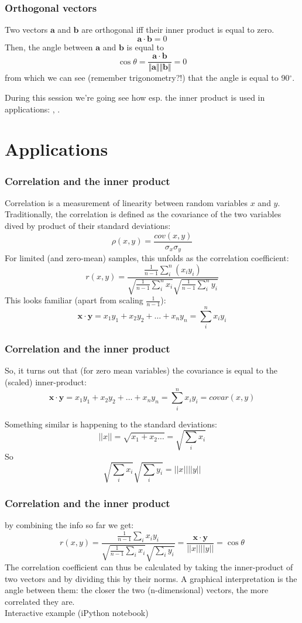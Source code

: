 \documentclass{beamer}
\begin{document}
\begin{frame}
\frametitle{Orthogonal vectors}
Two vectors $\mathbf{a}$ and $\mathbf{b}$ are orthogonal iff their inner product is equal to zero.
$$\mathbf{a} \cdot  \mathbf{b} = 0 $$
Then, the angle between $\mathbf{a}$ and $\mathbf{b}$ is equal to
$$ \cos\theta =\frac{\mathbf{a} \cdot \mathbf{b}}{\Vert \mathbf{a}\Vert  \Vert \mathbf{b} \Vert} = 0$$ from which we can see (remember trigonometry?!) that the angle is equal to 90$^{\circ}$. 

During this session we're going see how esp. the inner product is used in applications: {}  ,  {}.
\end{frame}

\section{Applications}
\begin{frame}
\frametitle{Correlation and the inner product}
Correlation is a measurement of linearity between random variables $x$ and $y$.
Traditionally, the correlation is defined as the covariance of the two variables dived by product of their standard deviations:
$$\rho(x,y) = \frac{cov(x,y)}{\sigma_x\sigma_y}$$
For limited (and zero-mean) samples, this unfolds as the correlation coefficient:
$$r(x,y) = \frac{ \frac{1}{n-1} \sum_i^n (x_i y_i)}
{\sqrt{\frac{1}{n-1}\sum_i^n x_i } \sqrt{\frac{1}{n-1}\sum_i^n y_i}}$$
This looks familiar (apart from scaling $\frac{1}{n-1}$):
$$\mathbf{x} \cdot  \mathbf{y} = x_1 y_1 + x_2 y_2 + \ldots +  x_n y_n = \sum_i^n x_i y_i$$
\end{frame}

\begin{frame}
\frametitle{Correlation and the inner product}
So, it turns out that (for zero mean variables) the covariance is equal to the (scaled) inner-product:
$$\mathbf{x} \cdot  \mathbf{y} = x_1 y_1 + x_2 y_2 + \ldots + x_n y_n= \sum_i^n x_i y_i = covar(x,y)$$

Something similar is happening to the standard deviations:
$$||x|| = \sqrt{x_1 + x_2 \ldots} = \sqrt{\sum_i x_i}$$
So 
$$\sqrt{\sum_ix_i} \sqrt{\sum_iy_i} = ||x|| ||y||$$
\end{frame}


\begin{frame}
\frametitle{Correlation and the inner product}
by  combining the info so far we get:
$$r(x,y) = \frac{ \frac{1}{n-1}\sum_i x_i y_i}
{\sqrt{\frac{1}{n-1}\sum_i x_i} \sqrt{\sum_i y_i}} = \frac{\mathbf{x} \cdot  \mathbf{y} } {||x|| ||y||} = \cos{\theta}$$
The correlation coefficient can thus be calculated by taking the inner-product of two vectors and by dividing this by their norms. A graphical interpretation is the angle between them: the closer the two (n-dimensional) vectors, the more correlated they are.\\
Interactive example (iPython notebook)
\end{frame}
\end{document}
